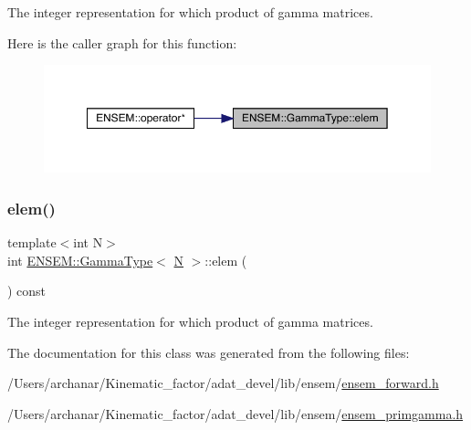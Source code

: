 The integer representation for which product of gamma matrices. 

Here is the caller graph for this function\+:\nopagebreak
\begin{figure}[H]
\begin{center}
\leavevmode
\includegraphics[width=350pt]{d6/d50/classENSEM_1_1GammaType_a2813c3878cd269c7a37c588875682705_icgraph}
\end{center}
\end{figure}
\mbox{\label{classENSEM_1_1GammaType_a2813c3878cd269c7a37c588875682705}} 
\subsubsection{\texorpdfstring{elem()}{elem()}\hspace{0.1cm}{\footnotesize\ttfamily [2/2]}}
{\footnotesize\ttfamily template$<$int N$>$ \\
int \mbox{\hyperlink{classENSEM_1_1GammaType}{E\+N\+S\+E\+M\+::\+Gamma\+Type}}$<$ \mbox{\hyperlink{operator__name__util_8cc_a7722c8ecbb62d99aee7ce68b1752f337}{N}} $>$\+::elem (\begin{DoxyParamCaption}{ }\end{DoxyParamCaption}) const\hspace{0.3cm}{\ttfamily [inline]}}



The integer representation for which product of gamma matrices. 



The documentation for this class was generated from the following files\+:\begin{DoxyCompactItemize}
\item 
/\+Users/archanar/\+Kinematic\+\_\+factor/adat\+\_\+devel/lib/ensem/\mbox{\hyperlink{lib_2ensem_2ensem__forward_8h}{ensem\+\_\+forward.\+h}}\item 
/\+Users/archanar/\+Kinematic\+\_\+factor/adat\+\_\+devel/lib/ensem/\mbox{\hyperlink{lib_2ensem_2ensem__primgamma_8h}{ensem\+\_\+primgamma.\+h}}\end{DoxyCompactItemize}
